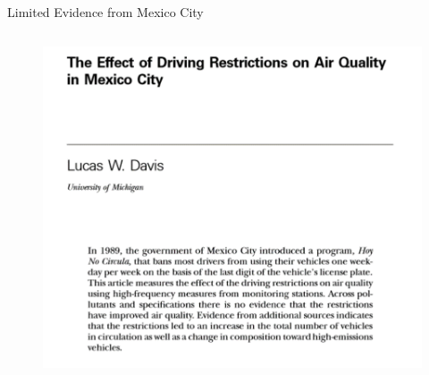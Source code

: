 \documentclass[newPxFont]{beamer}
\begin{document}
\begin{frame}[c]{Limited Evidence from Mexico City}
	\begin{columns}
		\begin{column}{.53\linewidth}
			\begin{figure}
				\centering
				\includegraphics[width=1.2\linewidth]{Davis_paper.png}
			\end{figure} 


\end{column}
\end{columns}
\end{frame}
\end{document}
